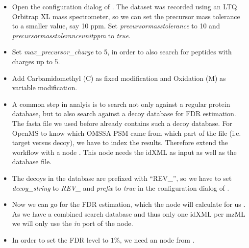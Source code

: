 \begin{itemize}
\item
Open the configuration dialog of .
The dataset was recorded using an LTQ Orbitrap XL mass spectrometer, so we can set the precursor mass tolerance to a smaller value, say 10 ppm.
Set \textit{precursor\textunderscore mass\textunderscore tolerance} to 10 and \\ \textit{precursor\textunderscore mass\textunderscore tolerance\textunderscore unit\textunderscore ppm} to \textit{true}.
\item
Set \textit{max\_precursor\_charge} to 5, in order to also search for peptides with charges up to 5.
\item
Add Carbamidomethyl (C) as fixed modification and Oxidation (M) as variable modification.
\item
A common step in analyis is to search not only against a regular protein database, but to also search against a decoy database for FDR estimation.
The fasta file we used before already contains such a decoy database.
For OpenMS to know which OMSSA PSM came from which part of the file (i.e. target versus decoy), we have to index the results.
Therefore extend the workflow with a  node .
This node needs the idXML as input as well as the database file.
\item
The decoys in the database are prefixed with ``REV\_'', so we have to set \textit{decoy\_string} to \textit{REV\_} and \textit{prefix} to \textit{true} in the configuration dialog of .
\item
Now we can go for the FDR estimation, which the  node will calculate for us .
As we have a combined search database and thus only one idXML per mzML we will only use the \textit{in} port of the  node.
\item
In order to set the FDR level to $1\%$, we need an  node from .

\end{itemize}

